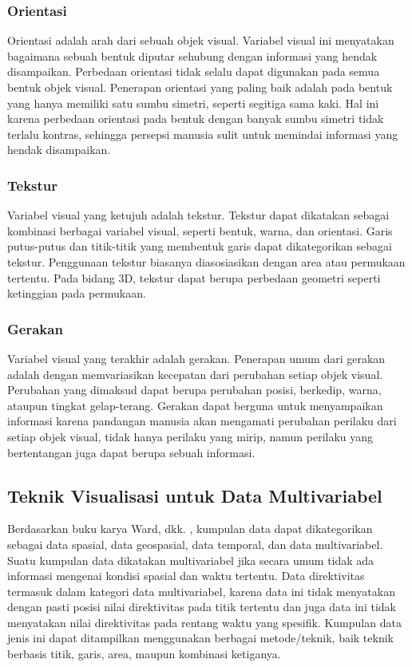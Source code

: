 \subsubsection{Orientasi}
Orientasi adalah arah dari sebuah objek visual. Variabel visual ini menyatakan bagaimana sebuah bentuk diputar sehubung dengan informasi yang hendak disampaikan. Perbedaan orientasi tidak selalu dapat digunakan pada semua bentuk objek visual. Penerapan orientasi yang paling baik adalah pada bentuk yang hanya memiliki satu sumbu simetri, seperti segitiga sama kaki. Hal ini karena perbedaan orientasi pada bentuk dengan banyak sumbu simetri tidak terlalu kontras, sehingga persepsi manusia sulit untuk memindai informasi yang hendak disampaikan.
\subsubsection{Tekstur}
Variabel visual yang ketujuh adalah tekstur. Tekstur dapat dikatakan sebagai kombinasi berbagai variabel visual, seperti bentuk, warna, dan orientasi. Garis putus-putus dan titik-titik yang membentuk garis dapat dikategorikan sebagai tekstur. Penggunaan tekstur biasanya diasosiasikan dengan area atau permukaan tertentu. Pada bidang 3D, tekstur dapat berupa perbedaan geometri seperti ketinggian pada permukaan.
\subsubsection{Gerakan}
Variabel visual yang terakhir adalah gerakan. Penerapan umum dari gerakan adalah dengan memvariasikan kecepatan dari perubahan setiap objek visual. Perubahan yang dimaksud dapat berupa perubahan posisi, berkedip, warna, ataupun tingkat gelap-terang. Gerakan dapat berguna untuk menyampaikan informasi karena pandangan manusia akan mengamati perubahan perilaku dari setiap objek visual, tidak hanya perilaku yang mirip, namun perilaku yang bertentangan juga dapat berupa sebuah informasi.


\subsection{Teknik Visualisasi untuk Data Multivariabel}
Berdasarkan buku karya Ward, dkk. \cite{buku_visual}, kumpulan data dapat dikategorikan sebagai data spasial, data geospasial, data temporal, dan data multivariabel. Suatu kumpulan data dikatakan multivariabel jika secara umum tidak ada informasi mengenai kondisi spasial dan waktu tertentu. Data direktivitas \bundengan termasuk dalam kategori data multivariabel, karena data ini tidak menyatakan dengan pasti posisi nilai direktivitas pada titik tertentu dan juga data ini tidak menyatakan nilai direktivitas pada rentang waktu yang spesifik. Kumpulan data jenis ini dapat ditampilkan menggunakan berbagai metode/teknik, baik teknik berbasis titik, garis, area, maupun kombinasi ketiganya. \par 
